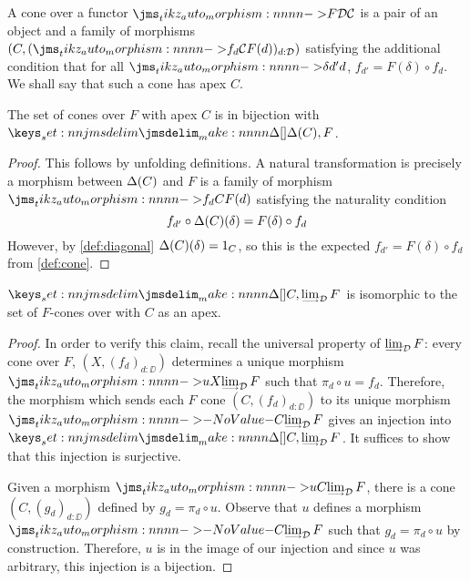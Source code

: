 \documentclass{amsart}
\begin{document}
\begin{definition}
  \label{def:cone}
  A cone over a functor $\Mor[F]{\DD}{\CC}$ is a pair of an object and a family of morphisms
  $(C, (\Mor[f_d]{\CC}{F(d)})_{d : \DD})$ satisfying the additional condition that for all
  $\Mor[\delta]{d'}{d}$, $f_{d'} = F(\delta) \circ f_d$. We shall say that such a cone has apex
  $C$.
\end{definition}

\begin{lemma}
  \label{lem:cone-to-nat-transform}
  The set of cones over $F$ with apex $C$ is in bijection with $\Hom{\Disc(C)}{F}$.
\end{lemma}
\begin{proof}
  This follows by unfolding definitions. A natural transformation is precisely a morphism between
  $\Delta(C)$ and $F$ is a family of morphism $\Mor[f_d]{C}{F(d)}$ satisfying the naturality condition
  \[
    f_{d'} \circ \Delta(C)(\delta) = F(\delta) \circ f_d
  \]
  However, by \cref{def:diagonal} $\Delta(C)(\delta) = 1_C$, so this is the expected
  $f_{d'} = F(\delta) \circ f_d$ from \cref{def:cone}.
\end{proof}

\begin{lemma}
  \label{lem:mor-to-cone}
  $\Hom{C}{\Lim_\DD F}$ is isomorphic to the set of $F$-cones over with $C$ as an apex.
\end{lemma}
\begin{proof}
  In order to verify this claim, recall the universal property of $\Lim_{\DD} F$: every cone over
  $F$, $(X, (f_d)_{d : \DD})$ determines a unique morphism $\Mor[u]{X}{\Lim_\DD F}$ such that
  $\pi_d \circ u = f_d$. Therefore, the morphism which sends each $F$ cone $(C, (f_d)_{d : \DD})$ to
  its unique morphism $\Mor{C}{\Lim_\DD F}$ gives an injection into $\Hom{C}{\Lim_\DD F}$. It
  suffices to show that this injection is surjective.

  Given a morphism $\Mor[u]{C}{\Lim_\DD F}$, there is a cone $(C, (g_d)_{d : \DD})$ defined by
  $g_d = \pi_d \circ u$. Observe that $u$ defines a morphism $\Mor{C}{\Lim_\DD F}$ such that
  $g_d = \pi_d \circ u$ by construction. Therefore, $u$ is in the image of our injection and since
  $u$ was arbitrary, this injection is a bijection.
\end{proof}
\end{document}

